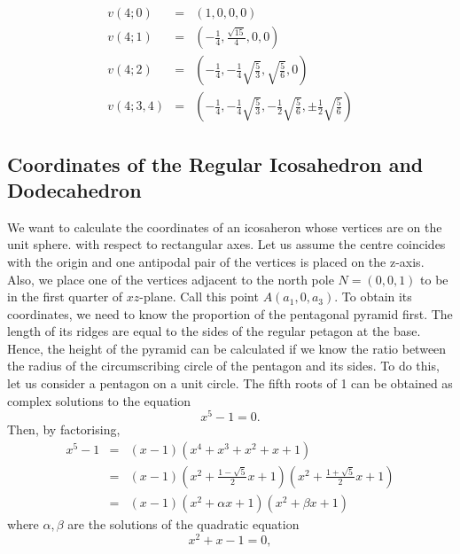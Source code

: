 \documentclass{article}
\begin{document}
\begin{exa}
\begin{eqnarray}
v(4;0) & = & (1,0,0,0)  \nonumber\\
v(4;1) & = & \left(-\frac{1}{4}, \frac{\sqrt{15}}{4},0,0\right) \nonumber\\
v(4;2) &=& \left(-\frac{1}{4}, -\frac{1}{4}\sqrt{\frac{5}{3}}, \sqrt{\frac{5}{6}},0\right) \nonumber\\
v(4;3,4) &=& \left(-\frac{1}{4}, -\frac{1}{4}\sqrt{\frac{5}{3}}, -\frac{1}{2}\sqrt{\frac{5}{6}},\pm \frac{1}{2}\sqrt{\frac{5}{6}}\right) \nonumber
\end{eqnarray}
\end{exa}

\subsection{Coordinates of the Regular Icosahedron and Dodecahedron}
\label{sec-2-2}
We want to calculate the coordinates of an icosaheron whose vertices are on the unit sphere. with respect to rectangular axes. Let us assume the centre coincides with the origin and one antipodal pair of the vertices is placed on the z-axis. Also, we place one of the vertices adjacent to the north pole $N = (0,0,1)$ to be in the first quarter of $xz$-plane. Call this point $A(a_1,0,a_3)$. To obtain its coordinates, we need to know the proportion of the pentagonal pyramid first. The length of its ridges are equal to the sides of the regular petagon at the base. Hence, the height of the pyramid can be calculated if we know the ratio between the radius of the circumscribing circle of the pentagon and its sides. To do this, let us consider a pentagon on a unit circle. The fifth roots of 1 can be obtained as complex solutions to the equation
\begin{equation}
\label{}
x^5 - 1=0.
\end{equation}
Then, by factorising, 
\begin{eqnarray}
x^5 - 1 & = & (x-1)(x^4 + x^3 + x^2 + x + 1) \nonumber \\
 & = &  (x-1)(x^2 + \frac{1-\sqrt{5}}{2}x + 1)(x^2 + \frac{1+\sqrt{5}}{2}x + 1) \nonumber\\
 & = &  (x-1)(x^2 + \alpha x + 1)(x^2 + \beta x + 1) \nonumber
\end{eqnarray}
where $\alpha, \beta$ are the solutions of the quadratic equation
\begin{equation}
\label{}
x^2 +x -1 = 0,
\end{equation}
\end{document}
